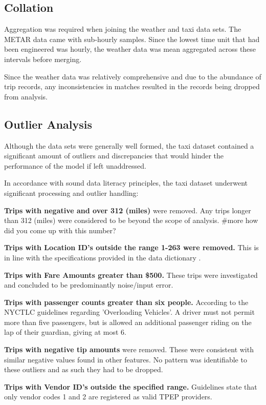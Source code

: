 \documentclass[11pt]{article}
\begin{document}
\subsection{Collation}
Aggregation was required when joining the weather and taxi data sets. The METAR data came with sub-hourly samples. Since the lowest time unit that had been engineered was hourly, the weather data was mean aggregated across these intervals before merging. 

Since the weather data was relatively comprehensive and due to the abundance of trip records, any inconsistencies in matches resulted in the records being dropped from analysis.


\subsection{Outlier Analysis}
Although the data sets were generally well formed, the taxi dataset contained a significant amount of outliers and discrepancies that would hinder the performance of the model if left unaddressed. 

In accordance with sound data literacy principles, the taxi dataset underwent significant processing and outlier handling:

\textbf{Trips with negative and over 312 (miles)} were removed. Any trips longer than 312 (miles) were considered to be beyond the scope of analysis. \#more how did you come up with this number?

\textbf{Trips with Location ID’s outside the range 1-263 were removed.} This is in line with the specifications provided in the data dictionary \cite{nyctlc_dd}.

\textbf{Trips with Fare Amounts greater than \$500.} These trips were investigated and concluded to be predominantly noise/input error.

\textbf{Trips with passenger counts greater than six people.} According to the NYCTLC guidelines \cite{nyctlc_pass} regarding 'Overloading Vehicles'. A driver must not permit more than five passengers, but is allowed an additional passenger riding on the lap of their guardian, giving at most 6.

\textbf{Trips with negative tip amounts} were removed. These were consistent with similar negative values found in other features. No pattern was identifiable to these outliers and as such they had to be dropped.

\textbf{Trips with Vendor ID’s outside the specified range.} Guidelines state that only vendor codes 1 and 2 are registered as valid TPEP providers\cite{nyctlc_dd}.
\end{document}
